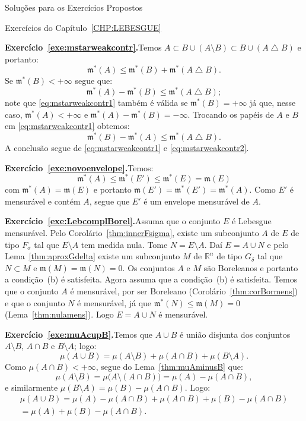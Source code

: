 \documentclass[oneside,final,11pt]{amsbook}
\newcommand{\R}{\mathds R}
\newcommand{\leb}{\mathfrak m}
\theoremstyle{remark}\newtheorem{exercise}{Exercício}[chapter]
\theoremstyle{remark}\newtheorem{*exercise}[exercise]{\hbox to 0pt{\hskip 0pt minus 1fil*}Exercício}
\theoremstyle{definition}\newtheorem{exdefin}{Definição}[chapter]
\theoremstyle{plain}\newtheorem{teo}{Teorema}[section]
\theoremstyle{plain}\newtheorem{lem}[teo]{Lema}
\theoremstyle{plain}\newtheorem{prop}[teo]{Proposição}
\theoremstyle{plain}\newtheorem{cor}[teo]{Corolário}
\theoremstyle{definition}\newtheorem{defin}[teo]{Definição}
\theoremstyle{remark}\newtheorem{rem}[teo]{Observação}
\theoremstyle{definition}\newtheorem{notation}[teo]{Notação}
\theoremstyle{definition}\newtheorem{convention}[teo]{Convenção}
\theoremstyle{definition}\newtheorem{example}[teo]{Exemplo}
\numberwithin{section}{chapter}
\numberwithin{equation}{section}
\begin{document}
\begin{chapter}{Soluções para os Exercícios Propostos}
\begin{section}{Exercícios do Capítulo~\ref{CHP:LEBESGUE}}
\medskip

\textbf{Exercício~\ref{exe:mstarweakcontr}.}\enspace Temos $A\subset B\cup(A\setminus B)
\subset B\cup(A\bigtriangleup B)$ e portanto:
\[\leb^*(A)\le\leb^*(B)+\leb^*(A\bigtriangleup B).\]
Se $\leb^*(B)<+\infty$ segue que:
\begin{equation}\label{eq:mstarweakcontr1}
\leb^*(A)-\leb^*(B)\le\leb^*(A\bigtriangleup B);
\end{equation}
note que \eqref{eq:mstarweakcontr1} também é válida se $\leb^*(B)=+\infty$ já que, nesse caso,
$\leb^*(A)<+\infty$ e $\leb^*(A)-\leb^*(B)=-\infty$. Trocando os papéis de $A$ e $B$
em \eqref{eq:mstarweakcontr1} obtemos:
\begin{equation}\label{eq:mstarweakcontr2}
\leb^*(B)-\leb^*(A)\le\leb^*(A\bigtriangleup B).
\end{equation}
A conclusão segue de \eqref{eq:mstarweakcontr1} e \eqref{eq:mstarweakcontr2}.

\medskip

\textbf{Exercício~\ref{exe:novoenvelope}.}\enspace Temos:
\[\leb^*(A)\le\leb^*(E')\le\leb^*(E)=\leb(E)\]
com $\leb^*(A)=\leb(E)$ e portanto $\leb(E')=\leb^*(E')=\leb^*(A)$. Como $E'$ é mensurável e contém $A$,
segue que $E'$ é um envelope mensurável de $A$.

\medskip

\textbf{Exercício~\ref{exe:LebcomplBorel}.}\enspace Assuma que o conjunto $E$ é Lebesgue mensurável.
Pelo Corolário~\ref{thm:innerFsigma}, existe um subconjunto $A$ de $E$ de tipo $F_\sigma$
tal que $E\setminus A$ tem medida nula. Tome $N=E\setminus A$. Daí $E=A\cup N$ e pelo Lema~\ref{thm:aproxGdelta}
existe um subconjunto $M$ de $\R^n$ de tipo $G_\delta$ tal que $N\subset M$ e
$\leb(M)=\leb(N)=0$. Os conjuntos $A$ e $M$ são Boreleanos e portanto a condição~(b)
é satisfeita. Agora assuma que a condição~(b) é satisfeita. Temos que o conjunto $A$ é mensurável,
por ser Boreleano (Corolário~\ref{thm:corBormens}) e que o conjunto $N$ é mensurável,
já que $\leb^*(N)\le\leb(M)=0$ (Lema~\ref{thm:nulamens}). Logo $E=A\cup N$ é mensurável.

\medskip

\textbf{Exercício~\ref{exe:muAcupB}.}\enspace Temos que $A\cup B$ é união disjunta
dos conjuntos $A\setminus B$, $A\cap B$ e $B\setminus A$; logo:
\[\mu(A\cup B)=\mu(A\setminus B)+\mu(A\cap B)+\mu(B\setminus A).\]
Como $\mu(A\cap B)<+\infty$, segue do Lema~\ref{thm:muAminusB} que:
\[\mu(A\setminus B)=\mu\big(A\setminus(A\cap B)\big)=\mu(A)-\mu(A\cap B),\]
e similarmente $\mu(B\setminus A)=\mu(B)-\mu(A\cap B)$. Logo:
\begin{multline*}
\mu(A\cup B)=\mu(A)-\mu(A\cap B)+\mu(A\cap B)+\mu(B)-\mu(A\cap B)\\=\mu(A)+\mu(B)-\mu(A\cap B).
\end{multline*}


\end{section}
\end{chapter}
\end{document}
